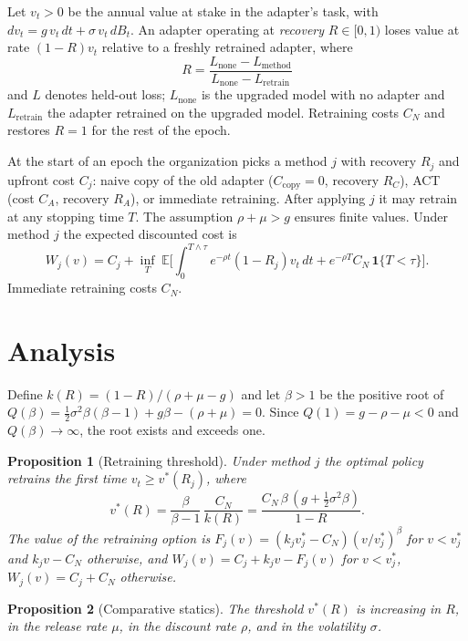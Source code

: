 \documentclass[preprint,12pt,authoryear]{elsarticle}
\newcommand{\E}{\mathbb{E}}
\newtheorem{proposition}{Proposition}
\begin{document}
Let $v_t>0$ be the annual value at stake in the adapter's task, with
$dv_t = g\,v_t\,dt + \sigma\,v_t\,dB_t$. An adapter operating at \emph{recovery} $R\in[0,1)$ loses value at rate
$(1-R)v_t$ relative to a freshly retrained adapter, where
\begin{equation}
R=\frac{L_{\text{none}}-L_{\text{method}}}{L_{\text{none}}-L_{\text{retrain}}}
\end{equation}
and $L$ denotes held-out loss; $L_{\text{none}}$ is the upgraded model with no adapter and $L_{\text{retrain}}$ the
adapter retrained on the upgraded model. Retraining costs $C_N$ and restores $R=1$ for the rest of the epoch.

At the start of an epoch the organization picks a method $j$ with recovery $R_j$ and upfront cost $C_j$: naive copy
of the old adapter ($C_{\text{copy}}=0$, recovery $R_C$), ACT (cost $C_A$, recovery $R_A$), or immediate retraining.
After applying $j$ it may retrain at any stopping time $T$. The assumption $\rho+\mu>g$ ensures finite values. Under
method $j$ the expected discounted cost is
\begin{equation}
W_j(v)=C_j+\inf_{T}\;\E\Big[\int_0^{T\wedge\tau}e^{-\rho t}(1-R_j)v_t\,dt+e^{-\rho T}C_N\,\mathbf 1\{T<\tau\}\Big].
\end{equation}
Immediate retraining costs $C_N$.

\section{Analysis}\label{sec:analysis}

Define $k(R)=(1-R)/(\rho+\mu-g)$ and let $\beta>1$ be the positive root of
$Q(\beta)=\tfrac12\sigma^2\beta(\beta-1)+g\beta-(\rho+\mu)=0$. Since $Q(1)=g-\rho-\mu<0$ and
$Q(\beta)\to\infty$, the root exists and exceeds one.

\begin{proposition}[Retraining threshold]\label{prop:thr}
Under method $j$ the optimal policy retrains the first time $v_t\ge v^*(R_j)$, where
\begin{equation}
v^*(R)=\frac{\beta}{\beta-1}\,\frac{C_N}{k(R)}=\frac{C_N\,\beta\,(g+\tfrac12\sigma^2\beta)}{1-R}.
\end{equation}
The value of the retraining option is $F_j(v)=(k_jv^*_j-C_N)(v/v^*_j)^\beta$ for $v<v^*_j$ and $k_jv-C_N$ otherwise, and
$W_j(v)=C_j+k_jv-F_j(v)$ for $v<v^*_j$, $W_j(v)=C_j+C_N$ otherwise.
\end{proposition}

\begin{proposition}[Comparative statics]\label{prop:cs}
The threshold $v^*(R)$ is increasing in $R$, in the release rate $\mu$, in the discount rate $\rho$, and in the
volatility $\sigma$.
\end{proposition}
\end{document}
